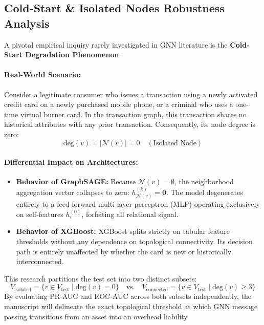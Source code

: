 \documentclass[11pt,a4paper]{article}
\begin{document}
\subsection{Cold-Start \& Isolated Nodes Robustness Analysis}
A pivotal empirical inquiry rarely investigated in GNN literature is the \textbf{Cold-Start Degradation Phenomenon}. 

\paragraph{Real-World Scenario:} Consider a legitimate consumer who issues a transaction using a newly activated credit card on a newly purchased mobile phone, or a criminal who uses a one-time virtual burner card. In the transaction graph, this transaction shares no historical attributes with any prior transaction. Consequently, its node degree is zero:
\begin{equation}
\text{deg}(v) = |\mathcal{N}(v)| = 0 \quad (\text{Isolated Node})
\end{equation}
\paragraph{Differential Impact on Architectures:}
\begin{itemize}[leftmargin=*]
    \item \textbf{Behavior of GraphSAGE:} Because $\mathcal{N}(v) = \emptyset$, the neighborhood aggregation vector collapses to zero: $h_{\mathcal{N}(v)}^{(k)} = \mathbf{0}$. The model degenerates entirely to a feed-forward multi-layer perceptron (MLP) operating exclusively on self-features $h_v^{(0)}$, forfeiting all relational signal.
    \item \textbf{Behavior of XGBoost:} XGBoost splits strictly on tabular feature thresholds without any dependence on topological connectivity. Its decision path is entirely unaffected by whether the card is new or historically interconnected.
\end{itemize}
This research partitions the test set into two distinct subsets:
\begin{equation}
V_{\text{isolated}} = \{v \in V_{\text{test}} \mid \text{deg}(v) = 0\} \quad \text{vs.} \quad V_{\text{connected}} = \{v \in V_{\text{test}} \mid \text{deg}(v) \ge 3\}
\end{equation}
By evaluating PR-AUC and ROC-AUC across both subsets independently, the manuscript will delineate the exact topological threshold at which GNN message passing transitions from an asset into an overhead liability.
\end{document}
